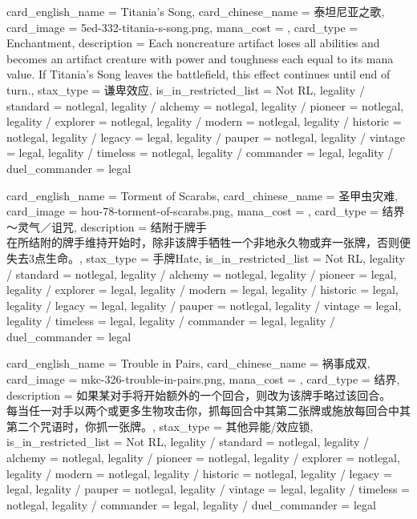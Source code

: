 \documentclass[lang = cn, color = black, 10pt]{AllThatStax}
\begin{document}
\card
{
	card_english_name = {Titania's Song},
	card_chinese_name = {泰坦尼亚之歌},
	card_image = 5ed-332-titania-s-song.png,
	mana_cost = ,
	card_type = Enchantment,
	description = {Each noncreature artifact loses all abilities and becomes an artifact creature with power and toughness each equal to its mana value. If Titania's Song leaves the battlefield, this effect continues until end of turn.},
	stax_type = 谦卑效应,
	is_in_restricted_list = Not RL,
	legality / standard = notlegal,
	legality / alchemy = notlegal,
	legality / pioneer = notlegal,
	legality / explorer = notlegal,
	legality / modern = notlegal,
	legality / historic = notlegal,
	legality / legacy = legal,
	legality / pauper = notlegal,
	legality / vintage = legal,
	legality / timeless = notlegal,
	legality / commander = legal,
	legality / duel_commander = legal
}

\card
{
	card_english_name = {Torment of Scarabs},
	card_chinese_name = {圣甲虫灾难},
	card_image = hou-78-torment-of-scarabs.png,
	mana_cost = ,
	card_type = 结界～灵气／诅咒,
	description = {结附于牌手\\
		在所结附的牌手维持开始时，除非该牌手牺牲一个非地永久物或弃一张牌，否则便失去3点生命。},
	stax_type = 手牌Hate,
	is_in_restricted_list = Not RL,
	legality / standard = notlegal,
	legality / alchemy = notlegal,
	legality / pioneer = legal,
	legality / explorer = legal,
	legality / modern = legal,
	legality / historic = legal,
	legality / legacy = legal,
	legality / pauper = notlegal,
	legality / vintage = legal,
	legality / timeless = legal,
	legality / commander = legal,
	legality / duel_commander = legal
}

\card
{
	card_english_name = {Trouble in Pairs},
	card_chinese_name = {祸事成双},
	card_image = mkc-326-trouble-in-pairs.png,
	mana_cost = ,
	card_type = 结界,
	description = {如果某对手将开始额外的一个回合，则改为该牌手略过该回合。\\
		每当任一对手以两个或更多生物攻击你，抓每回合中其第二张牌或施放每回合中其第二个咒语时，你抓一张牌。},
	stax_type = 其他异能/效应锁,
	is_in_restricted_list = Not RL,
	legality / standard = notlegal,
	legality / alchemy = notlegal,
	legality / pioneer = notlegal,
	legality / explorer = notlegal,
	legality / modern = notlegal,
	legality / historic = notlegal,
	legality / legacy = legal,
	legality / pauper = notlegal,
	legality / vintage = legal,
	legality / timeless = notlegal,
	legality / commander = legal,
	legality / duel_commander = legal
}
\end{document}
